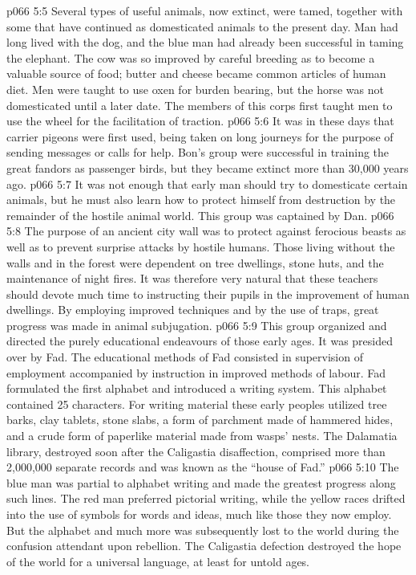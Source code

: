 \vs p066 5:5 Several types of useful animals, now extinct, were tamed, together with some that have continued as domesticated animals to the present day. Man had long lived with the dog, and the blue man had already been successful in taming the elephant. The cow was so improved by careful breeding as to become a valuable source of food; butter and cheese became common articles of human diet. Men were taught to use oxen for burden bearing, but the horse was not domesticated until a later date. The members of this corps first taught men to use the wheel for the facilitation of traction.
\vs p066 5:6 It was in these days that carrier pigeons were first used, being taken on long journeys for the purpose of sending messages or calls for help. Bon’s group were successful in training the great fandors as passenger birds, but they became extinct more than 30,000 years ago.
\vs p066 5:7 \bibnobreakspace {} It was not enough that early man should try to domesticate certain animals, but he must also learn how to protect himself from destruction by the remainder of the hostile animal world. This group was captained by Dan.
\vs p066 5:8 The purpose of an ancient city wall was to protect against ferocious beasts as well as to prevent surprise attacks by hostile humans. Those living without the walls and in the forest were dependent on tree dwellings, stone huts, and the maintenance of night fires. It was therefore very natural that these teachers should devote much time to instructing their pupils in the improvement of human dwellings. By employing improved techniques and by the use of traps, great progress was made in animal subjugation.
\vs p066 5:9 \bibnobreakspace {} This group organized and directed the purely educational endeavours of those early ages. It was presided over by Fad. The educational methods of Fad consisted in supervision of employment accompanied by instruction in improved methods of labour. Fad formulated the first alphabet and introduced a writing system. This alphabet contained 25 characters. For writing material these early peoples utilized tree barks, clay tablets, stone slabs, a form of parchment made of hammered hides, and a crude form of paperlike material made from wasps’ nests. The Dalamatia library, destroyed soon after the Caligastia disaffection, comprised more than 2,000,000 separate records and was known as the “house of Fad.”
\vs p066 5:10 The blue man was partial to alphabet writing and made the greatest progress along such lines. The red man preferred pictorial writing, while the yellow races drifted into the use of symbols for words and ideas, much like those they now employ. But the alphabet and much more was subsequently lost to the world during the confusion attendant upon rebellion. The Caligastia defection destroyed the hope of the world for a universal language, at least for untold ages.
